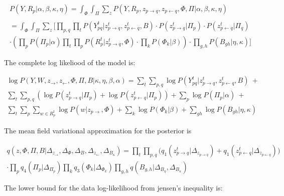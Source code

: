 \begin{eqnarray}
P(Y, R_{p} | \alpha, \beta, \kappa, \eta) = \int_{\Phi} \! \int_{\Pi} \sum_{z} \! P(Y, R_{p}, z_{p \rightarrow q}, z_{p \leftarrow q}, \Phi, \Pi | 
\alpha, \beta, \kappa, \eta)  \nonumber \\  \nonumber
\\ = \int_{\Phi} \! \int_{\Pi} \sum_{z} \! \bigg[ \prod_{p,q} \prod_{t}
P(Y_{pq}^{t} | z_{p \rightarrow q}^{t}, z_{p \leftarrow q}^{t}, B) 
\cdot P(z_{p \rightarrow q}^{t} | \Pi_{p}) \cdot P(z_{p \leftarrow q}^{t} |
\Pi_{q})  \nonumber
\\ \cdot \left(\prod_{p} P(\Pi_{p} | \alpha) \prod_{t} \prod_{p} P(R_{p}^{t} |
z_{p \rightarrow q}^{t}, \Phi) \cdot \prod_{k} P(\Phi_{k} | \beta)\right) \cdot
\prod_{g,h}P(B_{gh} | \eta, \kappa) \bigg]
\end{eqnarray}

The complete log likeliood of the model is:

\begin{align}
\log \! P(Y, W, z_{\rightarrow}, z_{\leftarrow}, \Phi, \Pi, B | \kappa, \eta,
\beta, \alpha) = \sum_{t} \! \sum_{p,q} \! \log P(Y_{pq}^{t} | z_{p \rightarrow
q}^{t} , z_{p \leftarrow q}^{t}, B)~+ \nonumber  \\\nonumber \sum_{t} \!
\sum_{p,q} \! (\log P(z_{p \rightarrow q}^{t} | \Pi_{p}) + \log \! P(z_{p \leftarrow q}^{t} |
\Pi_{p})) + \sum_{p} \! \log \! P(\Pi_{p} | \alpha) ~+\\  \sum_{t} \!
\sum_{p} \! \sum_{w \in R_{p}^{t}} \log P(w | z_{p \rightarrow}, \Phi) +
\sum_{k} \! \log P(\Phi_{k} | \beta) + \sum_{gh} \! \log P(B_{gh} | \eta,
\kappa)
\end{align}

The mean field variational approximation for the posterior is 

\begin{align}
q(z, \Phi, \Pi, B | \Delta_{z_{\rightarrow}}, \Delta_{\Phi}, \Delta_{B},
\Delta_{z_{\leftarrow}}, \Delta_{B_{\kappa}}) = \prod_{t} \! \prod_{p,q} \!
\bigg( q_{1}(z_{p \rightarrow q}^{t} | \Delta_{z_{p \rightarrow q}}) +
q_{1}(z_{p \leftarrow q}^{t} | \Delta_{z_{p \leftarrow q}})  \bigg) \nonumber \\
\cdot \prod_{p} \! q_{4}(\Pi_{p} | \Delta_{\Pi_{p}}) \prod_{k} q_{3} (\Phi_{k} |
\Delta_{\Phi_{k}}) \prod_{g,h} \! q(B_{g,h} | \Delta_{B_{\eta}}, \Delta_{B_{\kappa}})
\end{align}

The lower bound for the data log-likelihood from jensen's inequality is: 

